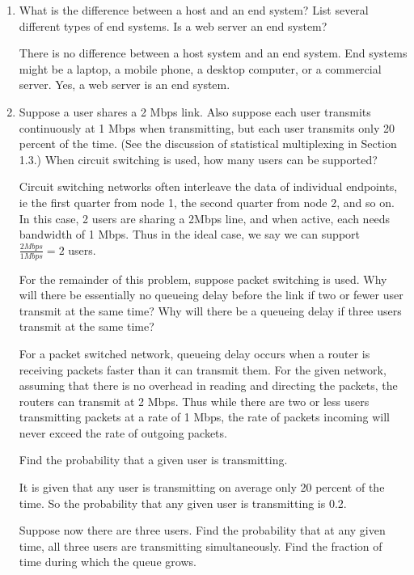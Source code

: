 \documentclass[10pt]{article}
\begin{document}
\begin{enumerate}
    \item What is the difference between a host and an end system? List several different types of end systems. Is a web server an end system?
    
    There is no difference between a host system and an end system.  End systems might be a laptop, a mobile phone, a desktop computer, or a commercial server.  Yes, a web server is an end system.
    
    \item Suppose a user shares a 2 Mbps link. Also suppose each user transmits continuously at 1 Mbps when transmitting, but each user transmits only 20 percent of the time. (See the discussion of statistical multiplexing in Section 1.3.) When circuit switching is used, how many users can be supported?
    
    Circuit switching networks often interleave the data of individual endpoints, ie the first quarter from node 1, the second quarter from node 2, and so on.  In this case, 2 users are sharing a 2Mbps line, and when active, each needs bandwidth of 1 Mbps.  Thus in the ideal case, we say we can support $\frac{2 Mbps}{1 Mbps} = 2$ users.
    
    For the remainder of this problem, suppose packet switching is used. Why will there be essentially no queueing delay before the link if two or fewer user transmit at the same time? Why will there be a queueing delay if three users transmit at the same time?
     
    For a packet switched network, queueing delay occurs when a router is receiving packets faster than it can transmit them.  For the given network, assuming that there is no overhead in reading and directing the packets, the routers can transmit at 2 Mbps.  Thus while there are two or less users transmitting packets at a rate of 1 Mbps, the rate of packets incoming will never exceed the rate of outgoing packets.
     
    Find the probability that a given user is transmitting.
     
    It is given that any user is transmitting on average only 20 percent of the time.  So the probability that any given user is transmitting is 0.2.
     
    Suppose now there are three users. Find the probability that at any given time, all three users are transmitting simultaneously. Find the fraction of time during which the queue grows.


\end{enumerate}
\end{document}
